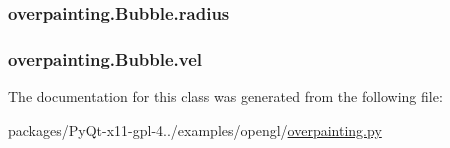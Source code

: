 \subsubsection[{radius}]{\setlength{\rightskip}{0pt plus 5cm}overpainting.\+Bubble.\+radius}\label{classoverpainting_1_1Bubble_a7f0da47640471540208356801e799c11}
\hypertarget{classoverpainting_1_1Bubble_a215ee0649d4a2a14a2ca63b8da9d7d2c}{}
\subsubsection[{vel}]{\setlength{\rightskip}{0pt plus 5cm}overpainting.\+Bubble.\+vel}\label{classoverpainting_1_1Bubble_a215ee0649d4a2a14a2ca63b8da9d7d2c}


The documentation for this class was generated from the following file\+:\begin{DoxyCompactItemize}
\item 
packages/\+Py\+Qt-\/x11-\/gpl-\/4../examples/opengl/\hyperlink{overpainting_8py}{overpainting.\+py}\end{DoxyCompactItemize}
